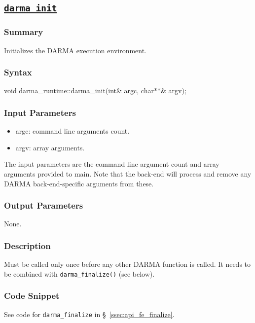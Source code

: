 \subsection{\underline{\texttt{darma\_init}}}
\hspace{0.1cm} %
\begin{subs}
\vspace{-1.2cm}

\subsubsection{Summary}
Initializes the DARMA execution environment.

\subsubsection{Syntax} 
\begin{CppCode}
void darma_runtime::darma_init(int& argc, char**& argv);
\end{CppCode}

\subsubsection{Input Parameters} 
\begin{itemize}
\item argc: command line arguments count.
\item argv: array arguments.
\end{itemize}
The input parameters are the command line argument count 
and array arguments provided to main.  
Note that the back-end will process and remove 
any DARMA back-end-specific arguments from these.

\subsubsection{Output Parameters} 
None.


\subsubsection{Description} 
Must be called only once before any other DARMA function is called.
It needs to be combined with \texttt{darma\_finalize()} (see below).

\subsubsection{Code Snippet} 
See code for \texttt{darma\_finalize} in \S~\ref{ssec:api_fe_finalize}.

\end{subs}




